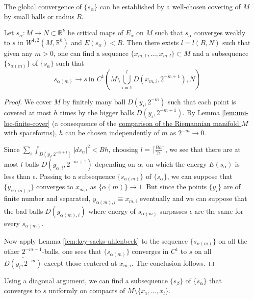 The global convergence of \(\{s_\alpha\}\) can be established by a well-chosen covering
of \(M\) by small balls or radius \(R\).

\begin{proposition}
\label{prop:2-sacks-uhlenbeck}
Let \(s_\alpha:M \longrightarrow N\subset \mathbb{R}^k\) be critical maps of \(E_\alpha\) on \(M\) such that \(s_\alpha\) converges weakly to \(s\) in \(W^{1,2}(M,
\mathbb{R}^k)\) and \(E(s_\alpha) < B\). Then there exists \(l=l(B,N)\) such that given any \(m>0\),
one can find a sequence \(\{x_{m,1},\dots, x_{m,l}\}\subset M\) and a subsequence \(\{s_{\alpha(m)}\}\) of \(\{s_\alpha\}\) such that
\[
 s_{\alpha(m)} \longrightarrow  s\ \text{in } C^1\left(M\setminus\bigcup_{i=1}^{l} D(x_{m,i}, 2^{-m+1}),N\right)
\]
\end{proposition}
\begin{proof}
We cover \(M\) by finitely many ball \(D(y_i, 2^{-m})\) such that each point is covered
at most \(h\) times by the bigger balls \(D(y_i,2^{-m+1})\). By Lemma
\ref{lem:uni-loc-finite-cover} (a consequence of the \href{sobolev-riemannian.org}{comparison of the Riemannian
manifold \(M\) with spaceforms}), \(h\) can be chosen independently of \(m\) as \(2^{-m} \to 0\).


Since \(\sum_i \int_{D(y_i, 2^{-m+1})} |ds_\alpha|^2 < B h\), choosing \(l = \lceil
\frac{Bh}{2\epsilon} \rceil\), we see that there are at most \(l\) balls \(D(y_{\alpha,i},
2^{-m+1})\) depending on \(\alpha\), on which the energy \(E(s_\alpha)\) is less than
\(\epsilon\). Passing to a subsequence \(\{s_{\alpha(m)}\}\) of \(\{s_\alpha\}\),
we can suppose that \(\{y_{\alpha(m),i} \}\) converges to \(x_{m,i}\) as \(\{\alpha(m)\} \to 1\). But since the points \(\{y_i\}\) are of finite number and
separated, \(y_{\alpha(m),i}\equiv x_{m,i}\) eventually and we can suppose that the bad balls
\(D(y_{\alpha(m),i})\) where energy of \(s_{\alpha(m)}\) surpasses \(\epsilon\) are
the same for every \(s_{\alpha(m)}\).

Now apply Lemma \ref{lem:key-sacks-uhlenbeck} to the sequence \(\{s_{\alpha(m)}\}\) on all
the other \(2^{-m+1}\)-balls, one sees that \(\{s_{\alpha(m)}\}\) converges in \(C^1\) to \(s\) on all \(\overline{D(y_i, 2^{-m})}\) except those centered at \(x_{m,i}\). The conclusion follows.
\end{proof}

Using a diagonal argument, we can find a subsequence \(\{s_\beta\}\) of \(\{s_\alpha\}\) that converges to \(s\) uniformly on compacts of \(M\setminus \{x_1,\dots, x_l\}\).


